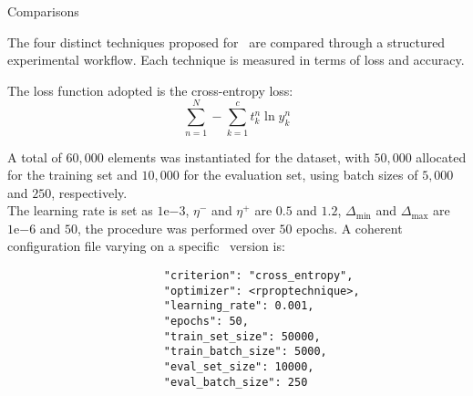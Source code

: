 \begin{section}{Comparisons}
    \par The four distinct techniques proposed for~ are compared through a structured experimental workflow. Each technique is measured in terms of loss and accuracy.
    \par The loss function adopted is the cross-entropy loss:
    \[
        \sum_{n=1}^{N} - \sum_{k=1}^{c} t_{k}^{n} \ln y_{k}^{n}
    \]
    \par A total of $60,000$ elements was instantiated for the dataset, with $50,000$ allocated for the training set and $10,000$ for the evaluation set, using batch sizes of $5,000$ and $250$, respectively.\\
    The learning rate is set as $1\mathrm{e}{-3}$, $\eta^{-}$ and $\eta^{+}$ are $0.5$ and $1.2$, $\Delta_{\min}$ and $\Delta_{\max}$ are $1\mathrm{e}{-6}$ and $50$, the procedure was performed over $50$ epochs. A coherent configuration file varying on a specific~ version is:\\
    \begin{verbatim}
                        "criterion": "cross_entropy",
                        "optimizer": <rproptechnique>,
                        "learning_rate": 0.001,
                        "epochs": 50,
                        "train_set_size": 50000,
                        "train_batch_size": 5000,
                        "eval_set_size": 10000,
                        "eval_batch_size": 250
    \end{verbatim}
    \clearpage
    
    
\end{section}